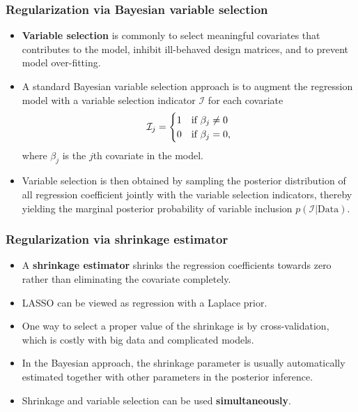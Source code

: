 \documentclass[10pt]{beamer}
\begin{document}
\begin{frame}
  \frametitle{Regularization via Bayesian variable selection}

  \begin{itemize}
  \item \textbf{Variable selection} is commonly to select meaningful covariates that
    contributes to the model, inhibit ill-behaved design matrices, and to
    prevent model over-fitting.

  \item A standard Bayesian variable selection approach \citep{nott2005adaptive} is to augment the
    regression model with a variable selection indicator $\mathcal{I}$ for each
    covariate
\[
\mathcal{I}_{j}=\begin{cases}
1 & \text{if \ensuremath{\beta_{j}\neq0}}\\
0 & \text{if \ensuremath{\beta_{j}=0}},
\end{cases}
\]
where $\beta_{j}$ is the $j$th covariate in the model.


\item Variable selection is then obtained by sampling the posterior
  distribution of all regression coefficient jointly with the variable
  selection indicators, thereby yielding the marginal posterior probability of
  variable inclusion $p(\mathcal{I}|\text{Data})$.

  \end{itemize}
\end{frame}

\begin{frame}
  \frametitle{Regularization via shrinkage estimator}

  \begin{itemize}
  \item A \textbf{shrinkage estimator} shrinks the regression coefficients towards zero
    rather than eliminating the covariate completely.
  \item LASSO can be viewed as regression with a Laplace prior.

  \item One way to select a proper value of the shrinkage is by
    cross-validation, which is costly with big data and complicated models.

  \item In the Bayesian approach, the shrinkage parameter is usually
    automatically estimated together with other parameters in the posterior
    inference.

  \item Shrinkage and variable selection can be used \textbf{simultaneously}.

  \end{itemize}

\end{frame}
\end{document}
